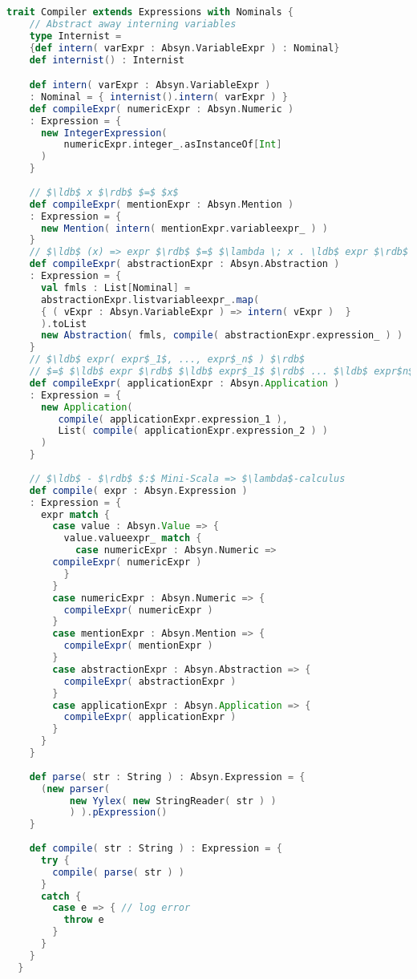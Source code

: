 \begin{lstlisting}[language=Scala,mathescape=true]
  trait Compiler extends Expressions with Nominals {
    // Abstract away interning variables
    type Internist =
    {def intern( varExpr : Absyn.VariableExpr ) : Nominal}
    def internist() : Internist

    def intern( varExpr : Absyn.VariableExpr )
    : Nominal = { internist().intern( varExpr ) }
    def compileExpr( numericExpr : Absyn.Numeric )
    : Expression = {
      new IntegerExpression(
          numericExpr.integer_.asInstanceOf[Int]
      )
    }
    
    // $\ldb$ x $\rdb$ $=$ $x$
    def compileExpr( mentionExpr : Absyn.Mention )
    : Expression = {
      new Mention( intern( mentionExpr.variableexpr_ ) )
    }
    // $\ldb$ (x) => expr $\rdb$ $=$ $\lambda \; x . \ldb$ expr $\rdb$ 
    def compileExpr( abstractionExpr : Absyn.Abstraction )
    : Expression = {
      val fmls : List[Nominal] =
      abstractionExpr.listvariableexpr_.map(
      { ( vExpr : Absyn.VariableExpr ) => intern( vExpr )  }
      ).toList
      new Abstraction( fmls, compile( abstractionExpr.expression_ ) )	    
    }
    // $\ldb$ expr( expr$_1$, ..., expr$_n$ ) $\rdb$
    // $=$ $\ldb$ expr $\rdb$ $\ldb$ expr$_1$ $\rdb$ ... $\ldb$ expr$n$ $\rdb$
    def compileExpr( applicationExpr : Absyn.Application )
    : Expression = {
      new Application(
         compile( applicationExpr.expression_1 ),
         List( compile( applicationExpr.expression_2 ) )
      )
    }
    
    // $\ldb$ - $\rdb$ $:$ Mini-Scala => $\lambda$-calculus
    def compile( expr : Absyn.Expression )
    : Expression = {
      expr match {
        case value : Absyn.Value => {
          value.valueexpr_ match {
            case numericExpr : Absyn.Numeric =>
	    compileExpr( numericExpr )
          }
        }
        case numericExpr : Absyn.Numeric => {
          compileExpr( numericExpr )
        }
        case mentionExpr : Absyn.Mention => {
          compileExpr( mentionExpr )
        }
        case abstractionExpr : Absyn.Abstraction => {
          compileExpr( abstractionExpr )	    
        }
        case applicationExpr : Absyn.Application => {
          compileExpr( applicationExpr )
        }
      }
    }
    
    def parse( str : String ) : Absyn.Expression = {
      (new parser(
           new Yylex( new StringReader( str ) )
           ) ).pExpression()
    }
    
    def compile( str : String ) : Expression = {
      try {
        compile( parse( str ) )
      }
      catch {
        case e => { // log error 
          throw e
        }
      }
    }
  }
\end{lstlisting}

